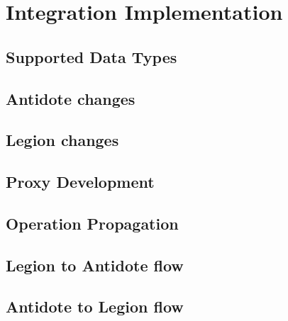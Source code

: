 \chapter{Integration Implementation}
\label{cha:integration_implementation}

\section{Supported Data Types}
\label{sec:supported_data_types}

\section{Antidote changes}
\label{sec:antidote_changes}

\section{Legion changes}
\label{sec:legion_changes}

\section{Proxy Development}
\label{sec:proxy_development}

\section{Operation Propagation}
\label{sec:operation_propagation}

\section{Legion to Antidote flow}
\label{sec:legion_to_antidote_flow}

\section{Antidote to Legion flow}
\label{sec:antidote to legion flow}